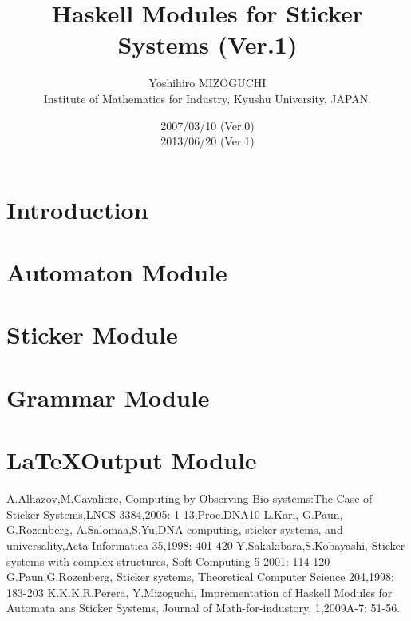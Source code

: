 \documentclass{article}
\begin{document}
\title{Haskell Modules for Sticker Systems (Ver.1)}

\author{Yoshihiro MIZOGUCHI\\
Institute of Mathematics for Industry, Kyushu University, JAPAN.}
\date{2007/03/10 (Ver.0)\\ 2013/06/20 (Ver.1)}

\maketitle

\tableofcontents

\section{Introduction}


\section{Automaton Module}



\section{Sticker Module}




\section{Grammar Module}




\section{\LaTeX Output Module}




\begin{thebibliography}{99}
A.Alhazov,M.Cavaliere, Computing by Observing Bio-systems:The Case of Sticker Systems,LNCS 3384,2005: 1-13,Proc.DNA10
L.Kari, G.Paun, G.Rozenberg, A.Salomaa,S.Yu,DNA computing, sticker systems, and universality,Acta Informatica 35,1998: 401-420
Y.Sakakibara,S.Kobayashi, Sticker systems with complex structures, Soft Computing 5 2001: 114-120
G.Paun,G.Rozenberg, Sticker systems, Theoretical
	Computer Science 204,1998: 183-203
K.K.K.R.Perera, Y.Mizoguchi,
Imprementation of Haskell Modules for Automata ans Sticker Systems,
Journal of Math-for-industory, 1,2009A-7: 51-56.
\end{thebibliography}
\end{document}
